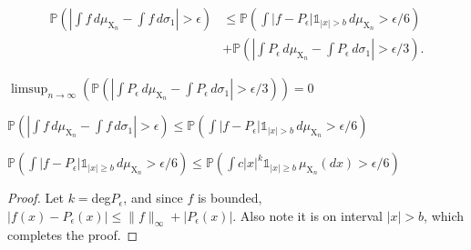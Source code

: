 

\begin{lemma}
    \label{lem:reestimate}
    \notready
     \begin{align*} \mathbb{P}\left( \left|\int f\,d\mu_{\mathrm{X}_n} - \int f\,d\sigma_1\right|>\epsilon\right) &\le \mathbb{P}\left(\int |f-P_\epsilon|\mathbb{1}_{|x|> b}\,d\mu_{\mathrm{X}_n}>\epsilon/6\right) \\ 
     &+ \mathbb{P}\left(\left|\int P_\epsilon\,d\mu_{\mathrm{X}_n} - \int P_\epsilon\,d\sigma_1\right| >\epsilon/3\right).
     \end{align*}
\end{lemma}


\begin{lemma}
    \label{lem:second_term_estimate}
    \notready
    $ \limsup_{n \to \infty} \left(\mathbb{P}\left(\left|\int P_\epsilon\,d\mu_{\mathrm{X}_n} - \int P_\epsilon\,d\sigma_1\right| >\epsilon/3\right) \right) = 0 $
\end{lemma}



\begin{lemma}
    \label{lem:final_estimate}
    \notready
    $\mathbb{P}\left( \left|\int f\,d\mu_{\mathrm{X}_n} - \int f\,d\sigma_1\right|>\epsilon\right) \leq \mathbb{P}\left(\int |f-P_\epsilon|\mathbb{1}_{|x|> b}\,d\mu_{\mathrm{X}_n}>\epsilon/6\right)$
\end{lemma}



\begin{lemma}  
    \label{lem:polynomial_ineq}
    \uses{}
    \notready
    $ \mathbb{P}\left(\int |f-P_\epsilon| \mathbb{1}_{|x|\ge b}\,d\mu_{\mathrm{X}_n} > \epsilon/6\right) \le \mathbb{P}\left(\int c|x|^k\mathbb{1}_{|x|\ge b}\,\mu_{\mathrm{X}_n}(dx) > \epsilon/6\right) $
    \begin{proof}
    Let $k =$deg$P_\epsilon$, and since $f$ is bounded, $|f(x) - P_{\epsilon}(x)| \leq \|f\|_{\infty} + |P_\epsilon(x)|$. Also note it is on interval $|x| > b$, which completes the proof.
    \end{proof}
\end{lemma}


